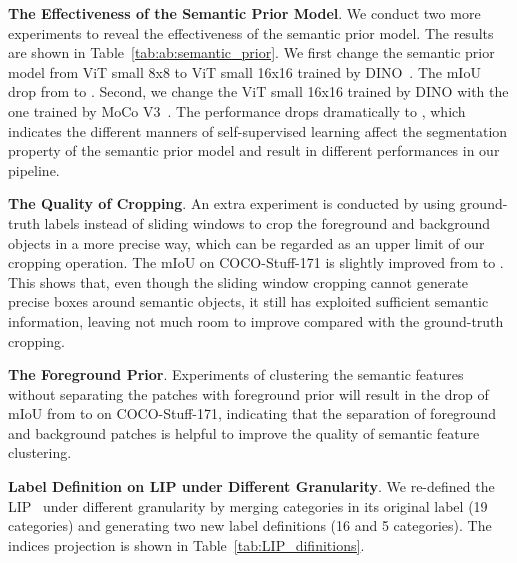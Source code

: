 \documentclass[runningheads]{llncs}
\newcommand{\PAR}[1]{\smallskip \noindent \textbf{#1}}
\newcommand{\tabref}[1]{Table~\ref{#1}}
\begin{document}
\PAR{The Effectiveness of the Semantic Prior Model}. We conduct two more experiments to reveal the effectiveness of the semantic prior model. The results are shown in \tabref{tab:ab:semantic_prior}. We first change the semantic prior model from ViT small 8x8 to ViT small 16x16 trained by DINO~\cite{DINO}. The mIoU drop from  to . Second, we change the ViT small 16x16 trained by DINO with the one trained by MoCo V3~\cite{MoCoV3}. The performance drops dramatically to , which indicates the different manners of self-supervised learning affect the segmentation property of the semantic prior model and result in different performances in our pipeline.



\PAR{The Quality of Cropping}. An extra experiment is conducted by using ground-truth labels instead of sliding windows to crop the foreground and background objects in a more precise way, which can be regarded as an upper limit of our cropping operation. The mIoU on COCO-Stuff-171 is slightly improved from  to . This shows that, even though the sliding window cropping cannot generate precise boxes around semantic objects, it still has exploited sufficient semantic information, leaving not much room to improve compared with the ground-truth cropping.

\PAR{The Foreground Prior}. Experiments of clustering the semantic features without separating the patches with foreground prior will result in the drop of mIoU from  to  on COCO-Stuff-171, indicating that the separation of foreground and background patches is helpful to improve the quality of semantic feature clustering.










\PAR{Label Definition on LIP under Different Granularity}. We re-defined the LIP~\cite{gong2017lip} under different granularity by merging categories in its original label (19 categories) and generating two new label definitions (16 and 5 categories). The indices projection is shown in \tabref{tab:LIP_difinitions}. 
\end{document}
